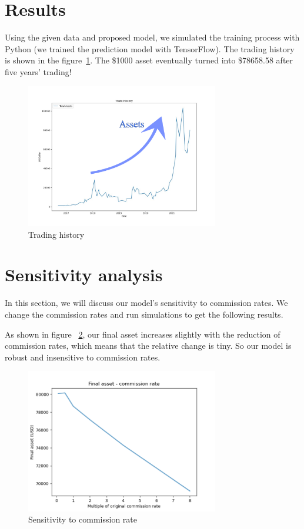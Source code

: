 \documentclass{mcmthesis}
\begin{document}
\section{Results}\label{details about ta}
Using the given data and proposed model, we simulated the training process with Python (we trained the prediction model with TensorFlow). The trading history is shown in the figure~\ref{trading history}. The \$1000 asset eventually turned into \$78658.58 after five years' trading!

\begin{figure}[htb]
\centering
\includegraphics[width = 0.75\textwidth]{fig/trading history.png}
\caption{Trading history}
\label{trading history}
\end{figure}

\section{Sensitivity analysis}
In this section, we will discuss our model's sensitivity to commission rates. We change the commission rates and run simulations to get the following results. 


As shown in figure ~\ref{fig:sensitivity result}, our final asset increases slightly with the reduction of commission rates, which means that the relative change is tiny. So our model is robust and insensitive to commission rates.


\begin{figure}[htb]
\centering
\includegraphics[width =  0.75\textwidth]{fig/sensitivity result.png}
\caption{Sensitivity to commission rate}
\label{fig:sensitivity result}
\end{figure}
\end{document}
